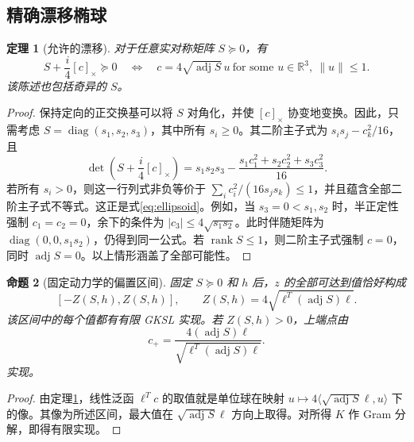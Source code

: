 \documentclass[UTF8,11pt,a4paper,fontset=fandol]{ctexart}
\newtheorem{theorem}{定理}[section]
\newtheorem{proposition}[theorem]{命题}
\theoremstyle{definition}
\theoremstyle{remark}
\DeclareMathOperator{\rank}{rank}
\DeclareMathOperator{\adj}{adj}
\DeclareMathOperator{\diag}{diag}
\newcommand{\R}{\mathbb R}
\newcommand{\PSD}{\succeq0}
\begin{document}
\subsection{精确漂移椭球}
\begin{theorem}[允许的漂移]\label{thm:drift-ellipsoid}
对于任意实对称矩阵 \(S\PSD\)，有
\begin{equation}\label{eq:ellipsoid}
 S+\frac{i}{4}[c]_\times\PSD
 \quad\Longleftrightarrow\quad
 c=4\sqrt{\adj S}\,u\ \text{for some }u\in\R^3,\ \|u\|\leq1.
\end{equation}
该陈述也包括奇异的 \(S\)。
\end{theorem}
\begin{proof}
保持定向的正交换基可以将 \(S\) 对角化，并使 \([c]_\times\) 协变地变换。因此，只需考虑 \(S=\diag(s_1,s_2,s_3)\)，其中所有 \(s_i\geq0\)。其二阶主子式为
\(s_i s_j-c_k^2/16\)，且
\begin{equation}\label{eq:det-ellipsoid}
 \det\left(S+\frac{i}{4}[c]_\times\right)
 =s_1s_2s_3-\frac{s_1c_1^2+s_2c_2^2+s_3c_3^2}{16}.
\end{equation}
若所有 \(s_i>0\)，则这一行列式非负等价于
\(\sum_i c_i^2/(16s_js_k)\leq1\)，并且蕴含全部二阶主子式不等式。这正是式\eqref{eq:ellipsoid}。例如，当 \(s_3=0<s_1,s_2\) 时，半正定性强制 \(c_1=c_2=0\)，余下的条件为 \(|c_3|\leq4\sqrt{s_1s_2}\)。此时伴随矩阵为 \(\diag(0,0,s_1s_2)\)，仍得到同一公式。若 \(\rank S\leq1\)，则二阶主子式强制 \(c=0\)，同时 \(\adj S=0\)。以上情形涵盖了全部可能性。
\end{proof}

\begin{proposition}[固定动力学的偏置区间]\label{prop:fixed-drift}
固定 \(S\PSD\) 和 \(h\) 后，\(z\) 的全部可达到值恰好构成
\begin{equation}\label{eq:bias-interval}
 [-Z(S,h),Z(S,h)],\qquad
 Z(S,h)=4\sqrt{\ell^T(\adj S)\ell}.
\end{equation}
该区间中的每个值都有有限 GKSL 实现。若 \(Z(S,h)>0\)，上端点由
\begin{equation}\label{eq:optimal-drift}
 c_+=\frac{4(\adj S)\ell}{\sqrt{\ell^T(\adj S)\ell}}.
\end{equation}
实现。
\end{proposition}
\begin{proof}
由定理\ref{thm:drift-ellipsoid}，线性泛函 \(\ell^Tc\) 的取值就是单位球在映射 \(u\mapsto4\langle\sqrt{\adj S}\ell,u\rangle\) 下的像。其像为所述区间，最大值在 \(\sqrt{\adj S}\ell\) 方向上取得。对所得 \(K\) 作 Gram 分解，即得有限实现。
\end{proof}
\end{document}
